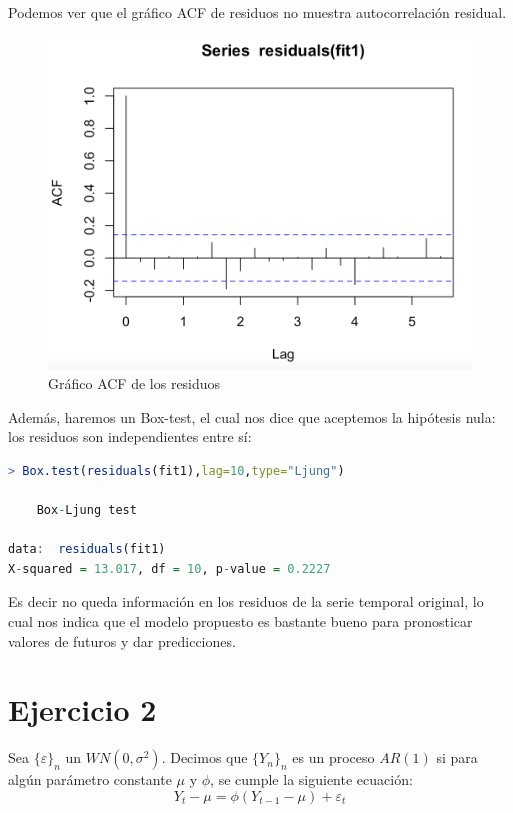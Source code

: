 \documentclass[a4paper,]{article}
\begin{document}
Podemos ver que el gráfico ACF de residuos no muestra autocorrelación residual. 
\begin{figure}[H]
    \centering
    \includegraphics[scale=0.5]{residuals.png}
    \caption*{Gráfico ACF de los residuos}
\end{figure}
Además, haremos un Box-test, el cual nos dice que aceptemos la hipótesis nula: los residuos son independientes entre sí:
\begin{lstlisting}[language=R]
> Box.test(residuals(fit1),lag=10,type="Ljung")

	Box-Ljung test

data:  residuals(fit1)
X-squared = 13.017, df = 10, p-value = 0.2227
\end{lstlisting}



Es decir no queda información en los residuos de la serie temporal original, lo cual nos indica que el modelo propuesto es bastante bueno para pronosticar valores de futuros y dar predicciones.\\


\section*{Ejercicio 2}
Sea $\{\varepsilon\}_n$ un $WN(0, \sigma^2)$. Decimos que $\{Y_n\}_n$ es un proceso $AR(1)$ si para algún parámetro constante $\mu$ y $\phi$, se cumple la siguiente ecuación: $$Y_t-\mu=\phi(Y_{t-1}-\mu)+\varepsilon_t$$
\\
\end{document}
